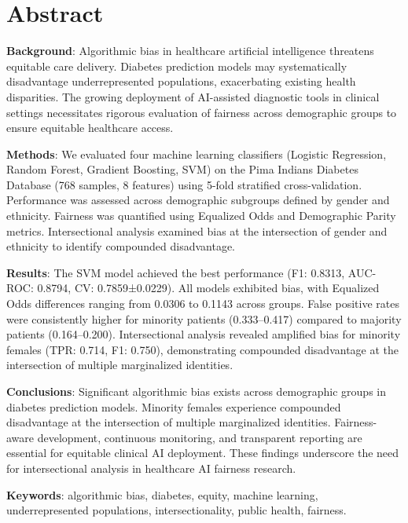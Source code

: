 
\section*{Abstract}

\textbf{Background}: Algorithmic bias in healthcare artificial intelligence 
threatens equitable care delivery. Diabetes prediction models may 
systematically disadvantage underrepresented populations, exacerbating 
existing health disparities. The growing deployment of AI-assisted diagnostic 
tools in clinical settings necessitates rigorous evaluation of fairness 
across demographic groups to ensure equitable healthcare access.

\textbf{Methods}: We evaluated four machine learning classifiers (Logistic 
Regression, Random Forest, Gradient Boosting, SVM) on the Pima Indians 
Diabetes Database (768 samples, 8 features) using 5-fold stratified 
cross-validation. Performance was assessed across demographic subgroups 
defined by gender and ethnicity. Fairness was quantified using Equalized 
Odds and Demographic Parity metrics. Intersectional analysis examined bias 
at the intersection of gender and ethnicity to identify compounded 
disadvantage.

\textbf{Results}: The SVM model achieved the best performance (F1: 0.8313, 
AUC-ROC: 0.8794, CV: 0.7859±0.0229). All models exhibited bias, with 
Equalized Odds differences ranging from 0.0306 to 0.1143 across groups. 
False positive rates were consistently higher for minority patients 
(0.333--0.417) compared to majority patients (0.164--0.200). Intersectional 
analysis revealed amplified bias for minority females (TPR: 0.714, F1: 0.750), 
demonstrating compounded disadvantage at the intersection of multiple 
marginalized identities.

\textbf{Conclusions}: Significant algorithmic bias exists across demographic 
groups in diabetes prediction models. Minority females experience compounded 
disadvantage at the intersection of multiple marginalized identities. 
Fairness-aware development, continuous monitoring, and transparent reporting 
are essential for equitable clinical AI deployment. These findings underscore 
the need for intersectional analysis in healthcare AI fairness research.

\textbf{Keywords}: algorithmic bias, diabetes, equity, machine learning, 
underrepresented populations, intersectionality, public health, fairness.
